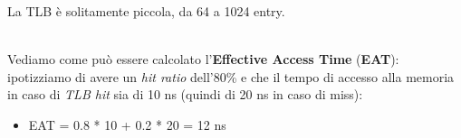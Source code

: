 \documentclass{article}
\begin{document}
				\newpage
				\noindent La TLB è solitamente piccola, da 64 a 1024 entry.
				\begin{figure}[ht!]
				\end{figure}
				\\Vediamo come può essere calcolato l'\textbf{Effective Access Time} (\textbf{EAT}): ipotizziamo di avere un \textit{hit ratio} dell'80\% e che il tempo di accesso alla memoria in caso di \textit{TLB hit} sia di 10 ns (quindi di 20 ns in caso di miss):
				\begin{itemize}
					\item EAT = 0.8 * 10 + 0.2 * 20 = 12 ns
				\end{itemize}
\end{document}
